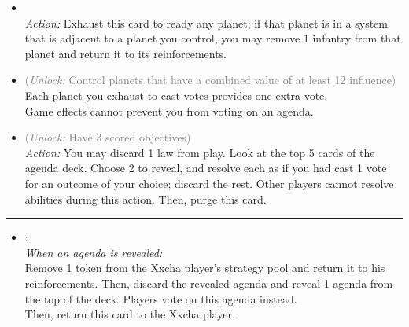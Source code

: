 \begin{multicols}{2}
\begin{itemize}
\item {}\\
\emph{Action:}
Exhaust this card to ready any planet; if that planet is in a system that is adjacent to a planet you control, you may remove 1 infantry from that planet and return it to its reinforcements. 
\item {} \textcolor{gray}{(\emph{Unlock:} Control planets that have a combined value of at least 12 influence)}\\
Each planet you exhaust to cast votes provides one extra vote.\\
Game effects cannot prevent you from voting on an agenda.
\item {} \textcolor{gray}{(\emph{Unlock:} Have 3 scored objectives)}\\
\emph{Action:} You may discard 1 law from play. Look at the top 5 cards of the agenda deck. Choose 2 to reveal, and resolve each as if you had cast 1 vote for an outcome of your choice; discard the rest. Other players cannot resolve abilities during this action. Then, purge this card. 
\end{itemize}

\vspace{-10pt}\rule{\hsize}{0.4pt}\vspace{5pt}


\begin{itemize}
\item {}:\\
\emph{When an agenda is revealed:}\\
Remove 1 token from the Xxcha player's strategy pool and return it to his reinforcements. Then, discard the revealed agenda and reveal 1 agenda from the top of the deck. Players vote on this agenda instead.\\
Then, return this card to the Xxcha player.
\end{itemize}

\end{multicols}



